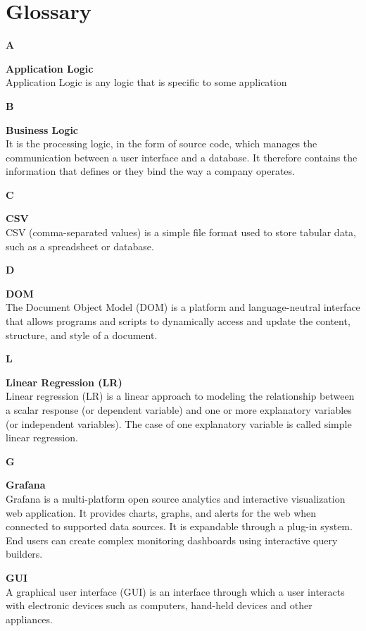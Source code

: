 \section{Glossary}

{\Large\textbf{A}\par}
\textbf{Application Logic}\\
Application Logic is any logic that is specific to some application

{\Large\textbf{B}\par}
\textbf{Business Logic}\\
It is the processing logic, in the form of source code, which manages the communication between a user interface and a database. It therefore contains the information that defines or they bind the way a company operates.

{\Large\textbf{C}\par}
\textbf{CSV}\\
CSV (comma-separated values) is a simple file format used to store tabular data, such as a spreadsheet or database.

{\Large\textbf{D}\par}
\textbf{DOM}\\
The Document Object Model (DOM) is a platform and language-neutral interface that allows programs and scripts to dynamically access and update the content, structure, and style of a document.

{\Large\textbf{L}\par}
\textbf{Linear Regression (LR)}\\
Linear regression (LR) is a linear approach to modeling the relationship between a scalar response (or dependent variable) and one or more explanatory variables (or independent variables). The case of one explanatory variable is called simple linear regression.

{\Large\textbf{G}\par}
\textbf{Grafana}\\
Grafana is a multi-platform open source analytics and interactive visualization web application. It provides charts, graphs, and alerts for the web when connected to supported data sources. It is expandable through a plug-in system. End users can create complex monitoring dashboards using interactive query builders.

\textbf{GUI}\\
A graphical user interface (GUI) is an interface through which a user interacts with electronic devices such as computers, hand-held devices and other appliances. 

